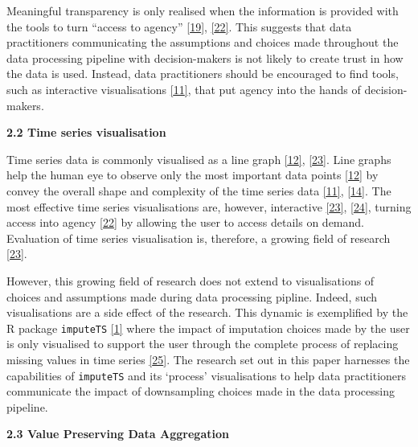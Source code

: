 \documentclass{article}
\begin{document}
Meaningful transparency is only realised when the information is
provided with the tools to turn ``access to agency''
\protect\hyperlink{ref-transparency_lack}{{[}19{]}},
\protect\hyperlink{ref-transparency_fallacy}{{[}22{]}}. This suggests
that data practitioners communicating the assumptions and choices made
throughout the data processing pipeline with decision-makers is not
likely to create trust in how the data is used. Instead, data
practitioners should be encouraged to find tools, such as interactive
visualisations \protect\hyperlink{ref-datapoint}{{[}11{]}}, that put
agency into the hands of decision-makers.

\textbf{2.2 Time series visualisation}

Time series data is commonly visualised as a line graph
\protect\hyperlink{ref-Sveinn}{{[}12{]}},
\protect\hyperlink{ref-timenotes}{{[}23{]}}. Line graphs help the human
eye to observe only the most important data points
\protect\hyperlink{ref-Sveinn}{{[}12{]}} by convey the overall shape and
complexity of the time series data
\protect\hyperlink{ref-datapoint}{{[}11{]}},
\protect\hyperlink{ref-downsampling}{{[}14{]}}. The most effective time
series visualisations are, however, interactive
\protect\hyperlink{ref-timenotes}{{[}23{]}},
\protect\hyperlink{ref-plotly}{{[}24{]}}, turning access into agency
\protect\hyperlink{ref-transparency_fallacy}{{[}22{]}} by allowing the
user to access details on demand. Evaluation of time series
visualisation is, therefore, a growing field of research
\protect\hyperlink{ref-timenotes}{{[}23{]}}.

However, this growing field of research does not extend to
visualisations of choices and assumptions made during data processing
pipline. Indeed, such visualisations are a side effect of the research.
This dynamic is exemplified by the R package \texttt{imputeTS}
\protect\hyperlink{ref-imputeTS_R}{{[}1{]}} where the impact of
imputation choices made by the user is only visualised to support the
user through the complete process of replacing missing values in time
series \protect\hyperlink{ref-imputeTS}{{[}25{]}}. The research set out
in this paper harnesses the capabilities of \texttt{imputeTS} and its
`process' visualisations to help data practitioners communicate the
impact of downsampling choices made in the data processing pipeline.

\textbf{2.3 Value Preserving Data Aggregation}
\end{document}
